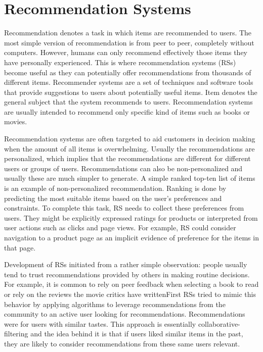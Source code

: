 \documentclass[main.tex]{thesis.tex}
\begin{document}
\chapter{Recommendation Systems}

Recommendation denotes a task in which items are recommended to users.
The most simple version of recommendation is from peer to peer, completely without computers.
However, humans can only recommend effectively those items they have personally experienced.
This is where recommendation systems (RSs) become useful as they can potentially offer recommendations from thousands of different items.
Recommender systems are a set of techniques and software tools that provide suggestions to users about potentially useful items.
Item denotes the general subject that the system recommends to users.
Recommendation systems are usually intended to recommend only specific kind of items such as books or movies. \cite{ricci11}

Recommendation systems are often targeted to aid customers in decision making when the amount of all items is overwhelming.
Usually the recommendations are personalized, which implies that the recommendations are different for different users or groups of users.
Recommendations can also be non-personalized and usually these are much simpler to generate.
A simple ranked top-ten list of items is an example of non-personalized recommendation.
Ranking is done by predicting the most suitable items based on the user's preferences and constraints.
To complete this task, RS needs to collect these preferences from users.
They might be explicitly expressed ratings for products or interpreted from user actions such as clicks and page views. For example, RS could consider navigation to a product page as an implicit evidence of preference for the items in that page. \cite{ricci11}

Development of RSs initiated from a rather simple observation: people usually tend to trust recommendations provided by others in making routine decisions.
For example, it is common to rely on peer feedback when selecting a book to read or rely on the reviews the movie critics have writtenFirst RSs tried to mimic this behavior by applying algorithms to leverage recommendations from the community to an active user looking for recommendations. Recommendations were for users with similar tastes. This approach is essentially collaborative-filtering and the idea behind it is that if users liked similar items in the past, they are likely to consider recommendations from these same users relevant. \cite{ricci11}
\end{document}
